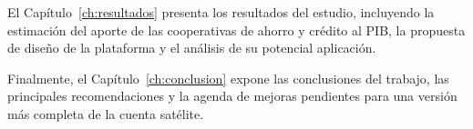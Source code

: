 El Capítulo~\ref{ch:resultados} presenta los resultados del estudio, incluyendo la estimación del aporte de las cooperativas de ahorro y crédito al PIB, la propuesta de diseño de la plataforma y el análisis de su potencial aplicación.
 
Finalmente, el Capítulo~\ref{ch:conclusion} expone las conclusiones del trabajo, las principales recomendaciones y la agenda de mejoras pendientes para una versión más completa de la cuenta satélite.



